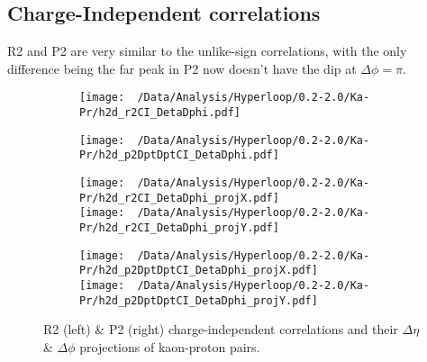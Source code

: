 \documentclass[12pt,a4paper,twoside]{report}
\begin{document}
\subsection{Charge-Independent correlations}
R2 and P2 are very similar to the unlike-sign correlations, with the only difference being the far peak in P2 now doesn't have the dip at $\Delta\phi=\pi$.
\begin{figure}[H]
	\begin{subfigure}{0.49\linewidth}
		\texttt{[image: ~/Data/Analysis/Hyperloop/0.2-2.0/Ka-Pr/h2d\_r2CI\_DetaDphi.pdf]}\\
	\end{subfigure}
	\begin{subfigure}{0.49\linewidth}
		\texttt{[image: ~/Data/Analysis/Hyperloop/0.2-2.0/Ka-Pr/h2d\_p2DptDptCI\_DetaDphi.pdf]}\\
	\end{subfigure}
\end{figure}
\begin{figure}[H]
	\ContinuedFloat
	\begin{subfigure}{0.49\linewidth}
		\texttt{[image: ~/Data/Analysis/Hyperloop/0.2-2.0/Ka-Pr/h2d\_r2CI\_DetaDphi\_projX.pdf]}\\
		\texttt{[image: ~/Data/Analysis/Hyperloop/0.2-2.0/Ka-Pr/h2d\_r2CI\_DetaDphi\_projY.pdf]}\\
	\end{subfigure}
	\begin{subfigure}{0.49\linewidth}
		\texttt{[image: ~/Data/Analysis/Hyperloop/0.2-2.0/Ka-Pr/h2d\_p2DptDptCI\_DetaDphi\_projX.pdf]}\\
		\texttt{[image: ~/Data/Analysis/Hyperloop/0.2-2.0/Ka-Pr/h2d\_p2DptDptCI\_DetaDphi\_projY.pdf]}\\
	\end{subfigure}
	\caption{R2 (left) \& P2 (right) charge-independent correlations and their $\Delta\eta$ \& $\Delta\phi$ projections of kaon-proton pairs.}
\end{figure}
\end{document}
